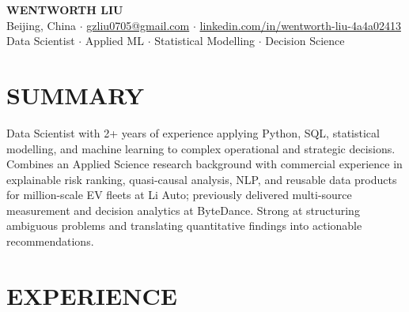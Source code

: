\documentclass[a4paper,10pt]{article}
\begin{document}
\begin{center}
    {\Large\bfseries WENTWORTH LIU}\\[2pt]
    {\small Beijing, China \;$\cdot$\; \href{mailto:gzliu0705@gmail.com}{gzliu0705@gmail.com} \;$\cdot$\; \href{https://www.linkedin.com/in/wentworth-liu-4a4a02413/}{linkedin.com/in/wentworth-liu-4a4a02413}}\\[2pt]
    {\small Data Scientist \;$\cdot$\; Applied ML \;$\cdot$\; Statistical Modelling \;$\cdot$\; Decision Science}
\end{center}

\vspace{-3pt}

\section{SUMMARY}
Data Scientist with 2+ years of experience applying Python, SQL, statistical modelling, and machine learning to complex operational and strategic decisions. Combines an Applied Science research background with commercial experience in explainable risk ranking, quasi-causal analysis, NLP, and reusable data products for million-scale EV fleets at Li Auto; previously delivered multi-source measurement and decision analytics at ByteDance. Strong at structuring ambiguous problems and translating quantitative findings into actionable recommendations.

\section{EXPERIENCE}
\end{document}
